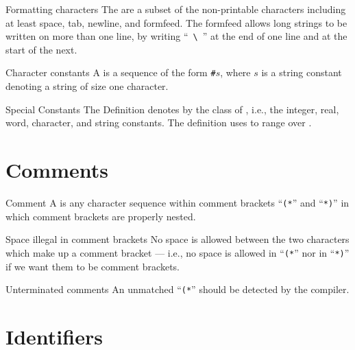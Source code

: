 \begin{definition}{Formatting characters}\label{defn:syntax-core:formatting-characters}
The  are a subset of the non-printable
characters including at least space, tab, newline, and formfeed. The
formfeed allows long strings to be written on more than one line, by
writing ``~\verb+\+~'' at the end of one line and at the start of the next.
\end{definition}

\begin{definition}{Character constants}
A  is a sequence of the form
\texttt{\#}$s$, where $s$ is a string constant denoting a string of
size one character.
\end{definition}

\begin{definition}{Special Constants}\label{defn:scon}
The Definition denotes by {\SCon} the class of ,
i.e., the integer, real, word, character, and string constants. The
definition uses {\scon} to range over \SCon.
\end{definition}

\section{Comments}

\begin{definition}{Comment}\label{defn:syntax-core:comment}
A  is any character sequence within comment brackets
``\texttt{(*}'' and ``\texttt{*)}'' in which comment brackets are
properly nested.
\end{definition}

\begin{clause}{Space illegal in comment brackets}
No space is allowed between the two characters which make up a comment
bracket --- i.e., no space is allowed in ``\texttt{(*}'' nor in
``\texttt{*)}'' if we want them to be comment brackets.
\end{clause}

\begin{clause}{Unterminated comments}
An unmatched ``\texttt{(*}'' should be detected by the compiler.
\end{clause}

\section{Identifiers}

